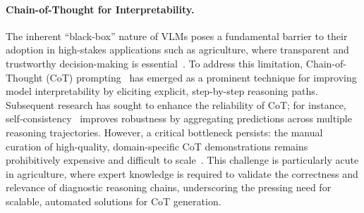 \documentclass[sigconf,anonymous,review]{acmart}
\begin{document}
\paragraph{Chain-of-Thought for Interpretability.}

The inherent ``black-box'' nature of VLMs poses a fundamental barrier to their adoption in high-stakes applications such as agriculture, where transparent and trustworthy decision-making is essential~\cite{sun2022black,bommasani2021opportunities,martin2024xai}. To address this limitation, Chain-of-Thought (CoT) prompting~\cite{wei2022chain} has emerged as a prominent technique for improving model interpretability by eliciting explicit, step-by-step reasoning paths. Subsequent research has sought to enhance the reliability of CoT; for instance, self-consistency~\cite{wang2022self} improves robustness by aggregating predictions across multiple reasoning trajectories. However, a critical bottleneck persists: the manual curation of high-quality, domain-specific CoT demonstrations remains prohibitively expensive and difficult to scale~\cite{wang2025beyond,lightman2023letsverifystepstep,kim2023cotcollectionimprovingzeroshot}. This challenge is particularly acute in agriculture, where expert knowledge is required to validate the correctness and relevance of diagnostic reasoning chains, underscoring the pressing need for scalable, automated solutions for CoT generation.
\end{document}
